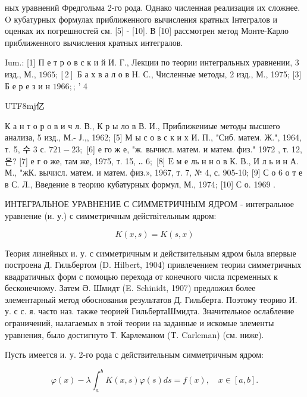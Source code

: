 \documentclass[10pt]{article}
\begin{document}
ных уравнений Фредгольма 2-го рода. Однако численная реализация их сложнее. $\mathrm{O}$ кубатурных формулах приближенного вычисления кратных Інтегралов и оценках их погрешностей см. [5] - [10]. В [10] рассмотрен метод Монте-Карло приближенного вычисления кратных интегралов.



Ium.: [1] П е т р о в с к и й И. Г., Лекции по теории интегральных уравнении, 3 изд., М., $1965 ;[2]$ Б а х в а л о в Н. С., Численные методы, 2 изд., М., 1975; [3] Б е р е з и н $1966 ;$; ' 4 \begin{CJK}{UTF8}{mj}亿\end{CJK} К а н т о р о в и ч л. В., К р ы ло в В. И., Приближениые методы высшего анализа, 5 изд., М.- Ј.,, 1962; [5] М ы с о в с к и х И. П., "Сиб. матем. Ж.", 1964, т. 5, 수 3 с. $721-23 ;$ [6] е го ж е, "ж. вычисл. матем. и матем. физ." 1972 , т. 12, 은? [7] е г о же, там же, 1975, т. 15, ‥ $6 ;$ [8] $\mathrm{E}$ м е ль н н о в К. В., И л ь и н А. М., "жК. вычисл. матем. и матем. физ.», 1967, т. 7, № 4, с. 905-10; [9] С о 6 о т е в С. Л., Введение в теорию кубатурных формул, М., 1974; [10] С о. 1969 .



ИНТЕГРАЛЬНОЕ УРАВНЕНИЕ С СИММЕТРИЧНЫМ ЯДРОМ - интегральное уравнение (и. у.) с симметричным действітельным ядром:



\[

K(x, s)=K(s, x)

\]



Теория линейных и. у. с симметричным и действительным ядром была впервые построена Д. Гильбертом (D. Hilbert, 1904) привлечением теории симметричных квадратичных форм с помоцью перехода от конечного числа псременных к бесконечному. Затем Ә. Шмидт (E. Schinidt, 1907) предложил более элементарный метод обоснования результатов Д. Гильберта. Поэтому теорию И. у. с с. я. часто наз. также теорией ГильбертаШмидта. Значительное ослабление ограничений, налагаемых в этой теории на заданные и искомые элементы уравнения, было достигнуто Т. Карлеманом (T. Carleman) (см. ниже).



Пусть имеется и. у. 2-го рода с действительным симметричным ядром:



\[

\varphi(x)-\lambda \int_{a}^{b} K(x, s) \varphi(s) d s=f(x), \quad x \in[a, b] .

\]
\end{document}
